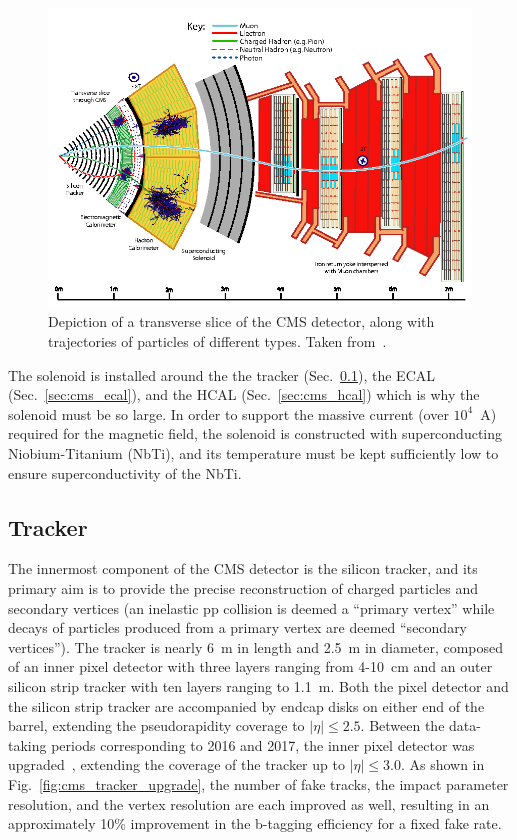 \begin{figure} [htbp!]
    \centering
    \includegraphics[width=\linewidth]{figures/cms/cms_transverse_view.png}
    \caption{Depiction of a transverse slice of the CMS detector, along with trajectories of particles of different types. Taken from~\cite{Sirunyan:2270046}.}
    \label{fig:cms_transverse_view}
\end{figure}

The solenoid is installed around the the tracker (Sec.~\ref{sec:cms_tracker}), the ECAL (Sec.~\ref{sec:cms_ecal}), and the HCAL (Sec.~\ref{sec:cms_hcal}) which is why the solenoid must be so large.
In order to support the massive current (over $10^4$~A) required for the magnetic field, the solenoid is constructed with superconducting Niobium-Titanium (NbTi), and its temperature must be kept sufficiently low to ensure superconductivity of the NbTi. 

\subsection{Tracker} \label{sec:cms_tracker}
The innermost component of the CMS detector is the silicon tracker, and its primary aim is to provide the precise reconstruction of charged particles and secondary vertices (an inelastic pp collision is deemed a ``primary vertex'' while decays of particles produced from a primary vertex are deemed ``secondary vertices'').
The tracker is nearly 6~m in length and 2.5~m in diameter, composed of an inner pixel detector with three layers ranging from 4-10~cm and an outer silicon strip tracker with ten layers ranging to 1.1~m.
Both the pixel detector and the silicon strip tracker are accompanied by endcap disks on either end of the barrel, extending the pseudorapidity coverage to $|\eta| \leq 2.5$.
Between the data-taking periods corresponding to 2016 and 2017, the inner pixel detector was upgraded~\cite{Botta:2285433}, extending the coverage of the tracker up to $|\eta| \leq 3.0$.
As shown in Fig.~\ref{fig:cms_tracker_upgrade}, the number of fake tracks, the impact parameter resolution, and the vertex resolution are each improved as well, resulting in an approximately 10\% improvement in the b-tagging efficiency for a fixed fake rate.

